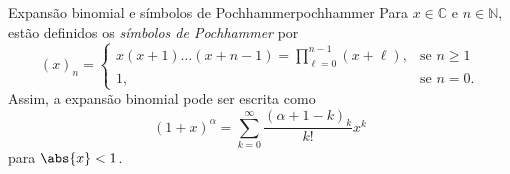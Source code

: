 \begin{proposition}{Expansão binomial e símbolos de Pochhammer}{pochhammer}
    Para \(x \in \mathbb{C}\) e \(n \in \mathbb{N}\), estão definidos os \emph{símbolos de Pochhammer} por
    \begin{equation*}
        (x)_n = \begin{cases}
            x(x+1)\dots(x+n-1) = \prod_{\ell = 0}^{n - 1} (x + \ell),&\text{se }n \geq 1\\
            1,&\text{se }n = 0.
        \end{cases}
    \end{equation*}
    Assim, a expansão binomial pode ser escrita como
    \begin{equation*}
        (1 + x)^\alpha = \sum_{k = 0}^\infty \frac{(\alpha + 1 - k)_k}{k!}x^k
    \end{equation*}
    para \(\abs{x} < 1\).
\end{proposition}
